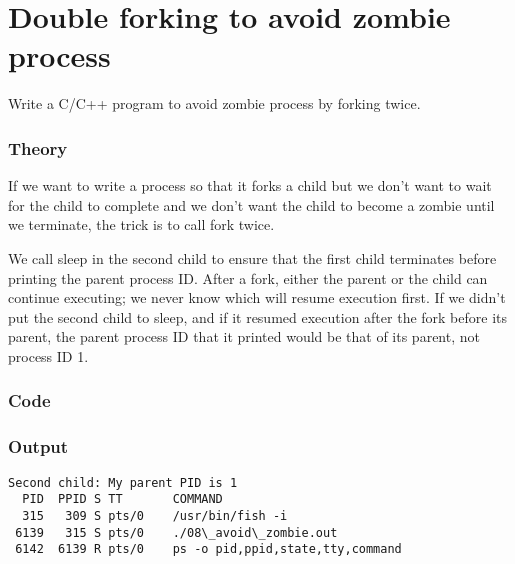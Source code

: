 \chapter{Double forking to avoid zombie process}

Write a C/C++ program to avoid zombie process by forking twice.

\subsection{Theory}

If we want to write a process so that it forks a child but we don't want to wait for the child to complete and we don't want the child to become a zombie until we terminate, the trick is to call fork twice.

We call sleep in the second child to ensure that the first child terminates before printing the parent process ID. After a fork, either the parent or the child can continue executing; we never know which will resume execution first. If we didn't put the second child to sleep, and if it resumed execution after the fork before its parent, the parent process ID that it printed would be that of its parent, not process ID 1.

\subsection{Code}



\subsection{Output}

\begin{lstlisting}[style=shell-output]
Second child: My parent PID is 1
  PID  PPID S TT       COMMAND
  315   309 S pts/0    /usr/bin/fish -i
 6139   315 S pts/0    ./08\_avoid\_zombie.out
 6142  6139 R pts/0    ps -o pid,ppid,state,tty,command
\end{lstlisting}
